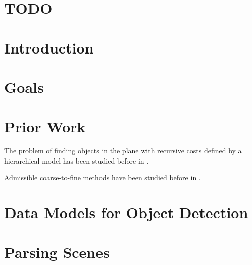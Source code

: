 \documentclass{book}
\begin{document}
  \section{TODO}
      

  \section{Introduction}
    \label{sec-detection-intro}
    

  \section{Goals}
    \label{sec-detection-goals}
    

  \section{Prior Work}
    \label{sec-detection-priorwork}
    The problem of finding objects in the plane with recursive costs
    defined by a hierarchical model has been studied before in
    \cite{jin-geman, grammar-tr, pictorial}. 

    Admissible coarse-to-fine methods have been studied before in
    \cite{astar, cfdp}.

%     

    

  \section{Data Models for Object Detection}
    \label{sec-detection-datamodel}
    

  \section{Parsing Scenes}
    \label{sec-detection-scenes}
    
\end{document}
